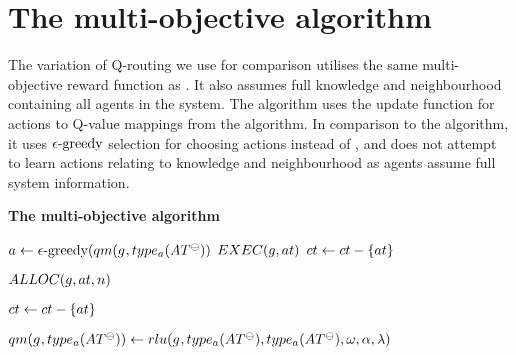 \section{The multi-objective \acronymBaseline{}{} algorithm}
\label{appendix:algorithm-qrouting}

\newcommand{\functionEGreedy}[2]{
	\functionSignature{\epsilon\text{-greedy}}{#1}
}

The variation of Q-routing we use for comparison utilises the same multi-objective reward function as \acronymWSNOptimisation{}{}. It also assumes full knowledge and neighbourhood containing all agents in the system. The algorithm uses the update function for actions to Q-value mappings from the \acronymATARIA{}{} algorithm. In comparison to the \acronymATARIA{}{} algorithm, it uses $\functionEGreedy{}{}$ selection for choosing actions instead of \acronymRewardTrendsAlgorithm{}{}, and does not attempt to learn actions relating to knowledge and neighbourhood as agents assume full system information.


\begin{algorithm}[ht]
	\DontPrintSemicolon
	\footnotesize
	
	\caption{\textbf{The multi-objective \acronymBaseline{}{} algorithm}}
	\label{alg:qrouting}
	{
			
		\nonl \;


		\nonl \;
		
		\For{$\varAtomicTask{}{} \in \varCompositeTask{}{} $}
		{
			$\varAction{}{} \leftarrow \functionEGreedy{\functionInstanceQMappingSignature}{}$\;		
			\uIf{$\varAction{}{} = \functionActionExecSignature{}{}$}
			{
				$EXEC(g, at)$\; \label{qrouting:doexec}
				{
					$\varCompositeTask{}{} \leftarrow \varCompositeTask{}{} - \lbrace \varAtomicTask{}{} \rbrace$ \;
				}\label{qrouting:hascapabilityend}
			}
			\uElseIf{$\varAction{}{} = \functionActionAllocSignature{}{}$}
			{
					$ALLOC(g, at, n)$\; \label{qrouting:doalloc}
					
					{
						$\varCompositeTask{}{} \leftarrow \varCompositeTask{}{} - \lbrace \varAtomicTask{}{} \rbrace$ \;
					}
			}\label{qrouting:hasallocend}
			$\functionInstanceQMappingSignature{}{} \leftarrow \functionTDUpdateSignature{}{}$\;\label{qrouting:updateq}
		}
		\Return{$\functionInstanceQMappingSignature{}{}$}
}
\end{algorithm}